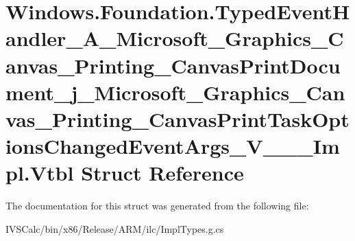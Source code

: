 \hypertarget{struct_windows_1_1_foundation_1_1_typed_event_handler___a___microsoft___graphics___canvas___prina399806699776adf996b32136eb3462f}{}\section{Windows.\+Foundation.\+Typed\+Event\+Handler\+\_\+\+A\+\_\+\+Microsoft\+\_\+\+Graphics\+\_\+\+Canvas\+\_\+\+Printing\+\_\+\+Canvas\+Print\+Document\+\_\+j\+\_\+\+Microsoft\+\_\+\+Graphics\+\_\+\+Canvas\+\_\+\+Printing\+\_\+\+Canvas\+Print\+Task\+Options\+Changed\+Event\+Args\+\_\+\+V\+\_\+\+\_\+\+\_\+\+Impl.\+Vtbl Struct Reference}
\label{struct_windows_1_1_foundation_1_1_typed_event_handler___a___microsoft___graphics___canvas___prina399806699776adf996b32136eb3462f}


The documentation for this struct was generated from the following file\+:\begin{DoxyCompactItemize}
\item 
I\+V\+S\+Calc/bin/x86/\+Release/\+A\+R\+M/ilc/Impl\+Types.\+g.\+cs\end{DoxyCompactItemize}
